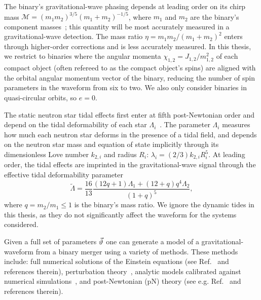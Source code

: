 The binary's gravitational-wave phasing depends at leading order
on its chirp mass $\mathcal{M} = (m_1 m_2)^{3/5} (m_1 + m_2)^{-1/5}$, where
$m_{1}$ and $m_{2}$ are the binary's component masses~\cite{Peters:1963ux}; 
this quantity will be most accurately measured 
in a gravitational-wave detection. The mass ratio $\eta = m_1 m_2 / (m_1 +
m_2)^2$ enters through higher-order corrections and is less accurately
measured. 
In this thesis, we restrict to binaries where the angular momenta $\chi_{1,2} = J_{1,2} /
m_{1,2}^2$ of each compact object (often refereed to as the compact object's spins) are aligned with the orbital angular momentum vector of the binary, reducing the number of spin parameters in the waveform from six to two. We also only consider binaries in quasi-circular orbits, so $e=0$.

The static neutron star tidal effects first enter at fifth post-Newtonian order
and depend on the tidal deformability of each star $\Lambda_i$~\cite{Flanagan:2007ix,Hinderer:2009ca}.
The parameter $\Lambda_i$ measures how much each neutron star deforms in the presence
of a tidal field, and depends on the neutron star mass and equation of state implicitly through its
dimensionless Love number $k_{2,i}$ and radius $R_i$:
$\lambda_i=(2/3)k_{2,i}R_i^5$. At leading order, the tidal effects are imprinted in
the gravitational-wave signal through the effective tidal deformability parameter
\begin{equation}
\tilde{\Lambda}
= \frac{16}{13}\frac{(12q+1)\Lambda_1+(12+q)q^4\Lambda_2}{(1+q)^5}, \label{eq:pe_tech_lambda_t0}
\end{equation}
where $q = m_2/m_1 \leq 1$ is the binary's mass ratio. We ignore the dynamic tides in this thesis, as they do not significantly affect the waveform for the systems considered.


Given a full set of parameters $\vec{\vartheta}$ one can generate a model of a gravitational-waveform from a binary merger using a variety of methods. These methods include: full numerical solutions of the Einstein equations (see Ref.~\cite{Cardoso:2014uka} and references therein), perturbation theory~\cite{Teukolsky:1972my,Berti:2009kk}, analytic models calibrated against numerical simulations~\cite{Buonanno:1998gg,Buonanno:2000ef,Damour:2000we,Damour:2001tu,Ajith:2007qp,Ajith:2009bn,Santamaria:2010yb}, and post-Newtonian (pN) theory (see e.g. Ref.~\cite{Blanchet2006} and references therein). 

